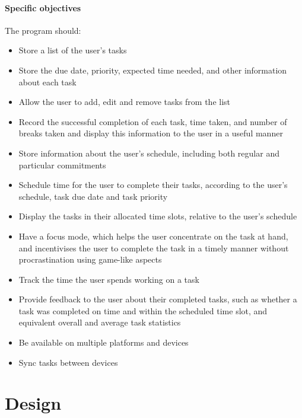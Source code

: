 \documentclass{article}
\begin{document}
\subsection{Specific objectives}
The program should:

\begin{itemize}
	\item Store a list of the user's tasks
	\item Store the due date, priority, expected time needed, and other information
	      about each task
	\item Allow the user to add, edit and remove tasks from the list
	\item Record the successful completion of each task, time taken, and number of
	      breaks taken and display this information to the user in a useful manner
	\item Store information about the user's schedule,
	      including both regular and particular commitments
	\item Schedule time for the user to complete their tasks, according to the
	      user's schedule, task due date and task priority
	\item Display the tasks in their allocated time slots,
    relative to the user's schedule
	\item Have a focus mode, which helps the user concentrate on the task at hand,
	      and incentivises the user to complete the task in a timely manner without
	      procrastination using game-like aspects
	\item Track the time the user spends working on a task
	\item Provide feedback to the user about their completed tasks,
	      such as whether a task was completed on time and within the scheduled time slot,
	      and equivalent overall and average task statistics
	\item Be available on multiple platforms and devices
	\item Sync tasks between devices
\end{itemize}


\part{Design}
\end{document}
